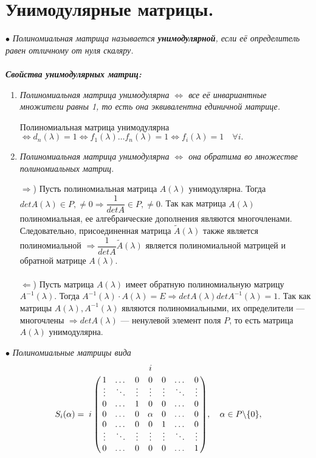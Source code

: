 \section{Унимодулярные матрицы.}
$\bullet$ \textit{Полиномиальная матрица называется \textbf{унимодулярной}, если её определитель равен отличному от нуля скаляру.}\\\\
\textit{\textbf{Свойства унимодулярных матриц:}}
\begin{enumerate}
	\item \textit{Полиномиальная матрица унимодулярна $\Longleftrightarrow$ все её инвариантные множители равны 1, то есть она эквивалентна единичной матрице.}
	\begin{Proof}
		Полиномиальная матрица унимодулярна $\Longleftrightarrow d_n(\lambda) = 1 \Longleftrightarrow
		f_1(\lambda)\dots f_n(\lambda) = 1 \Longleftrightarrow f_i(\lambda) = 1\quad \forall i.$
	\end{Proof}
	\item \textit{Полиномиальная матрица унимодулярна $\Longleftrightarrow$ она обратима во множестве полиномиальных матриц.}
	\begin{Proof}
		$\Rightarrow$) Пусть полиномиальная матрица $A(\lambda)$ унимодулярна. Тогда $detA(\lambda)\in P, \ne 0 \Rightarrow \dfrac 1{detA}\in P, \ne 0$. Так как матрица $A(\lambda)$ полиномиальная, ее алгебраические дополнения являются многочленами. Следовательно, присоединенная матрица $\widetilde{A}(\lambda)$ также является полиномиальной $\Rightarrow \dfrac 1{detA}\widetilde{A}(\lambda)$ является полиномиальной матрицей и обратной матрице $A(\lambda)$.\\\\
		$\Leftarrow$) Пусть матрица $A(\lambda)$ имеет обратную полиномиальную матрицу  $A^{-1}(\lambda)$. Тогда $A^{-1}(\lambda) \cdot A(\lambda) = E\Rightarrow detA(\lambda)det A^{-1}(\lambda) = 1$. Так как матрицы $A(\lambda), A^{-1}(\lambda)$ являются полиномиальными, их определители --- многочлены $\Rightarrow detA(\lambda)$ --- ненулевой элемент поля $P$, то есть матрица $A(\lambda)$ унимодулярна.
	\end{Proof}
\end{enumerate}
$\bullet$ \textit{Полиномиальные матрицы вида}
$$S_i(\alpha) = \bordermatrix{
	& & & & i & & & \cr
	& 1 & \dots & 0 & 0 & 0 & \dots & 0 \cr
	& \vdots & \ddots & \vdots & \vdots & \vdots & \ddots & \vdots \cr
	& 0 & \dots & 1 & 0 & 0 & \dots & 0 \cr
	i & 0 & \dots & 0 & \alpha & 0 & \dots & 0 \cr
	& 0 & \dots & 0 & 0 & 1 & \dots & 0 \cr
	& \vdots & \ddots & \vdots & \vdots & \vdots & \ddots & \vdots \cr
	& 0 & \dots & 0 & 0 & 0 & \dots & 1 \cr},\quad \alpha \in P\backslash\{0\},$$
